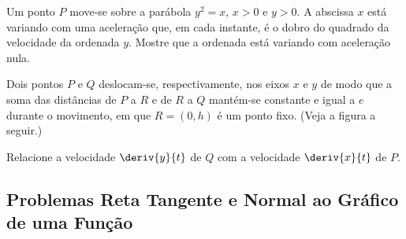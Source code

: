 \begin{exercicio}[20]
\label{ex:7.15.20}
Um ponto $P$ move-se sobre a parábola $y^2 = x$, $x > 0$ e $y > 0$. A abscissa $x$ está variando com uma aceleração que, em cada instante, é o dobro do quadrado da velocidade da ordenada $y$. Mostre que a ordenada está variando com aceleração nula.
\end{exercicio}

\begin{exercicio}[21]
\label{ex:7.15.21}
Dois pontos $P$ e $Q$ deslocam-se, respectivamente, nos eixos $x$ e $y$ de modo que a soma das distâncias de $P$ a $R$ e de $R$ a $Q$ mantém-se constante e igual a $e$ durante o movimento, em que $R = (0, h)$ é um ponto fixo. (Veja a figura a seguir.)

\begin{center}
\end{center}

Relacione a velocidade $\deriv{y}{t}$ de $Q$ com a velocidade $\deriv{x}{t}$ de $P$.
\end{exercicio}

\clearpage

\subsection{Problemas Reta Tangente e Normal ao Gráfico de uma Função}

